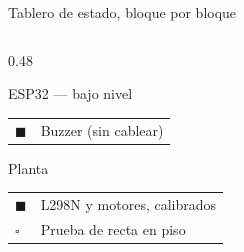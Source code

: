 \documentclass[aspectratio=169,10pt]{beamer}
\newcommand{\listo}{\textcolor{verde}{$\blacksquare$}}
\newcommand{\curso}{\textcolor{ambar}{$\blacksquare$}}
\newcommand{\pend}{\textcolor{grisclaro}{$\square$}}
\begin{document}
\begin{frame}{Tablero de estado, bloque por bloque}
\begin{columns}[T,onlytextwidth]
\begin{column}{0.48\textwidth}
\begin{block}{\textcolor{naranja}{ESP32 --- bajo nivel}}
\begin{tabular}{@{}p{0.4cm}p{4.6cm}@{}}
          \curso & Buzzer (sin cablear) \\
        \end{tabular}
      \end{block}
      \begin{block}{\textcolor{gris}{Planta}}
        \begin{tabular}{@{}p{0.4cm}p{4.6cm}@{}}
          \listo & L298N y motores, calibrados \\
          \pend & Prueba de recta en piso \\
        \end{tabular}
      \end{block}
    \end{column}
  \end{columns}
\end{frame}
\end{document}

